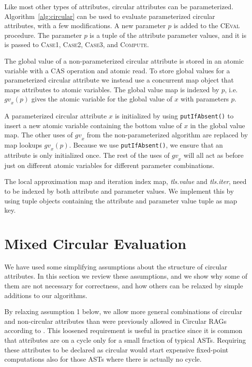 {Like most other types of attributes, circular attributes can be parameterized.
Algorithm~\ref{alg:circular} can be used to evaluate parameterized circular attributes,
with a few modifications.
A new parameter $p$ is added to the \textsc{CEval} procedure.
The parameter $p$ is a tuple of the attribute parameter values, and it is
is passed to \textsc{Case1}, \textsc{Case2}, \textsc{Case3}, and \textsc{Compute}.

The global value of a non-parameterized circular attribute is stored in
an atomic variable with a CAS operation and atomic read.
To store global values for a parameterized circular attribute
we instead use a concurrent map object that maps attributes to atomic variables.
The global value map is indexed by $p$, i.e. $\mathit{gv}_x(p)$ gives the atomic
variable for the global value of $x$ with parameters $p$.

A parameterized circular attribute $x$ is initialized
by using \verb'putIfAbsent()' to insert a new atomic variable containing the
bottom value of $x$ in the global value map.
The other uses of $\mathit{gv}_x$ from the non-parameterized algorithm
are replaced by map lookups $\mathit{gv}_x(p)$.
Because we use \verb'putIfAbsent()', we ensure that an attribute
is only initialized once. The rest of the uses of $\mathit{gv}_x$ will all act
as before just on different atomic variables for different parameter combinations.

The local approximation map and iteration index map,
\emph{tls.value} and \emph{tls.iter}, need to be indexed by both attribute
and parameter values.  We implement this by using tuple objects containing
the attribute and parameter value tuple as map key.


\section{Mixed Circular Evaluation}
\label{mixed-circular-eval}

We have used some simplifying assumptions about the structure of circular attributes.
In this section we review these assumptions, and we show why some of them are not necessary for
correctness, and how others can be relaxed by simple additions to our algorithms.

By relaxing assumption 1 below, we allow more general combinations of circular
and non-circular attributes than were previously allowed in Circular RAGs
according to \textcite{DBLP:journals/entcs/MagnussonH03}.
This loosened requirement is useful in practice
since it is common that attributes are on a
cycle only for a small fraction of typical ASTs. Requiring these attributes to
be declared as circular would start expensive fixed-point computations also for
those ASTs where there is actually no cycle.

}
